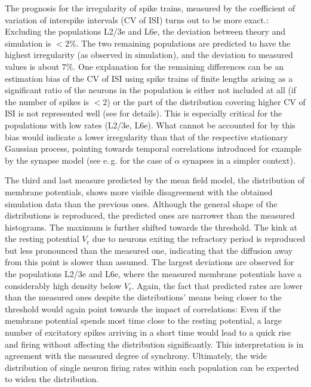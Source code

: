 The prognosis for the irregularity of spike trains, measured by the coefficient of
variation of interspike intervals (CV of ISI) turns out to be more exact.:
Excluding the populations L2/3e and L6e, the deviation between theory and simulation 
is $<2 \%$. The two remaining 
populations are predicted to have the highest irregularity (as observed in simulation), 
and the deviation to measured values is about $7 \%$. 
One explanation for the remaining differences can be an estimation bias of the CV of ISI 
using spike trains of finite lengths arising as a significant ratio of the neurons in the 
population is either not included at all (if the number of spikes is $ < 2$) or the part of the distribution 
covering higher CV of ISI is not represented well (see  for details). 
This is especially critical for the populations with low rates (L2/3e, L6e).
What cannot be accounted for by this bias would indicate a lower irregularity than that 
of the respective stationary Gaussian process, pointing towards temporal correlations
introduced for example by the synapse model 
(see e.\,g.  for the case of $\alpha$ synapses in a simpler context). 

The third and last measure predicted by the mean field model, the distribution of 
membrane potentials, shows more visible disagreement with the obtained simulation 
data than the previous ones. Although the general shape of the distributions is reproduced, the predicted
ones are narrower than the measured histograms. The maximum is further shifted 
towards the threshold. 
The kink at the resting potential $V_\text{r}$ due to neurons exiting the 
refractory period is reproduced but less pronounced than the measured one, indicating that the diffusion
away from this point is slower than assumed. The largest deviations are observed for 
the populations L2/3e and L6e, where the measured membrane potentials have a considerably 
high density below $V_\text{r}$.
Again, the fact that predicted rates are lower than the measured ones 
despite the distributions' means being closer to the threshold
would again point towards the impact of correlations:
Even if the membrane potential spends most time close to the resting potential, 
a large number of excitatory spikes arriving in a short time would lead to a quick rise and
firing without affecting the distribution significantly.  
This interpretation is in agreement with the measured degree of synchrony. 
Ultimately, the wide distribution of single neuron firing rates within each population
can be expected to widen the distribution. 

